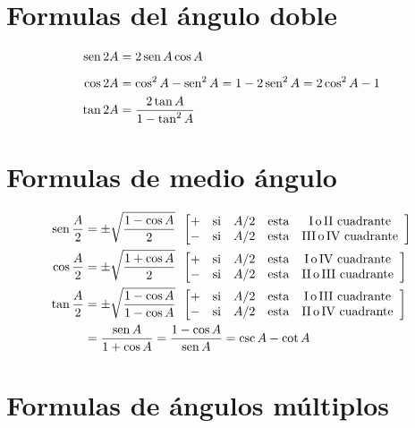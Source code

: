 \section*{Formulas del ángulo doble}
\begin{align*}
	\operatorname{sen} 2A &= 2\operatorname{sen} A \cos A \\[5pt]
	\cos 2A &= \cos^2 A -\operatorname{sen}^2 A = 1-2\operatorname{sen}^2 A = 2\cos^2 A - 1 \\
	\tan 2A &= \frac{2\tan A}{1-\tan^2 A}
\end{align*}

\section*{Formulas de medio ángulo}

\begin{align*}
	\operatorname{sen} \frac{A}{2} &= \pm\sqrt{\frac{1-\cos A}{2}}\,\,\, \begin{bmatrix}
+& \textrm{si} & A/2 & \textrm{esta} & \textrm{I\,o\,II\,\,cuadrante}\,\,\,\\ 
-& \textrm{si} & A/2 & \textrm{esta} & \textrm{III\,o\,IV\,\,cuadrante}\,\,\,\\ 
\end{bmatrix}\\
	\cos \frac{A}{2} &= \pm\sqrt{\frac{1+\cos A}{2}}\,\,\, \begin{bmatrix}
+& \textrm{si} & A/2 & \textrm{esta} & \textrm{I\,o\,IV\,\,cuadrante}\,\,\,\\ 
-& \textrm{si} & A/2 & \textrm{esta} & \textrm{II\,o\,III\,\,cuadrante}\,\,\,\\ 
\end{bmatrix}\\
	\tan \frac{A}{2} &= \pm\sqrt{\frac{1-\cos A}{1-\cos A}}\,\,\, \begin{bmatrix}
+& \textrm{si} & A/2 & \textrm{esta} & \textrm{I\,o\,III\,\,cuadrante}\,\,\,\\ 
-& \textrm{si} & A/2 & \textrm{esta} & \textrm{II\,o\,IV\,\,cuadrante}\,\,\,\\ 
\end{bmatrix}\\
&= \frac{\operatorname{sen} A}{1+\cos A} = \frac{1-\cos A}{\operatorname{sen} A} = \csc A - \cot A
\end{align*}

\section*{Formulas de ángulos múltiplos}

